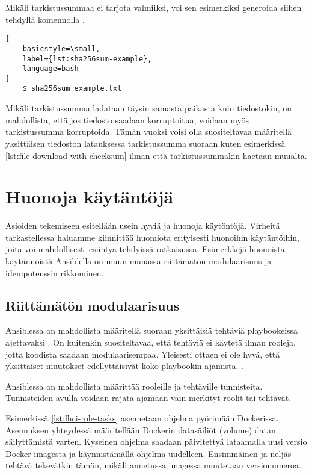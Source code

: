 Mikäli tarkistussummaa ei tarjota valmiiksi, voi sen esimerkiksi generoida siihen tehdyllä
komennolla \parencite{Sha256sumManPage}.

\begin{lstlisting}[
    basicstyle=\small,
    label={lst:sha256sum-example},
    language=bash
]
    $ sha256sum example.txt
\end{lstlisting}

Mikäli tarkistussumma ladataan täysin samasta paikasta kuin tiedostokin, on mahdollista, että
jos tiedosto saadaan korruptoitua, voidaan myös tarkistussumma korruptoida. Tämän vuoksi voisi
olla suositeltavaa määritellä yksittäisen tiedoston latauksessa tarkistussumma suoraan kuten
esimerkissä \ref{lst:file-download-with-checksum} ilman että tarkistussummakin haetaan muualta.

\section{Huonoja käytäntöjä}

Asioiden tekemiseen esitellään usein hyviä ja huonoja käytöntöjä. Virheitä
tarkastellessa haluamme kiinnittää huomiota erityisesti huonoihin käytäntöihin, joita
voi mahdollisesti esiintyä tehdyissä ratkaisussa. Esimerkkejä huonoista käytännöistä
Ansiblella on muun muuassa riittämätön modulaarisuus ja idempotenssin rikkominen.

\subsection{Riittämätön modulaarisuus}

Ansiblessa on mahdollista määritellä suoraan yksittäisiä tehtäviä playbookeissa ajettavaksi
\parencite{AnsibleDocs}. On kuitenkin suositeltavaa, että tehtäviä ei käytetä ilman rooleja,
jotta koodista saadaan modulaarisempaa. Yleisesti ottaen ei ole hyvä, että yksittäiset
muutokset edellyttäisivät koko playbookin ajamista. \parencite{KumaraIndika2021Tdad}.

Ansiblessa on mahdollista määrittää rooleille ja tehtäville tunnisteita. Tunnisteiden
avulla voidaan rajata ajamaan vain merkityt roolit tai tehtävät. \parencite{AnsibleDocs}

Esimerkissä \ref{lst:lhci-role-tasks} asennetaan ohjelma pyörimään Dockerissa. Asennuksen
yhteydessä määritellään Dockerin datasäiliöt (volume) datan säilyttämistä varten. Kyseinen
ohjelma saadaan päivitettyä lataamalla uusi versio Docker imagesta ja käynnistämällä ohjelma
uudelleen. Ensimmäinen ja neljäs tehtävä tekevätkin tämän, mikäli annetussa imagessa muutetaan
versionumeroa.

